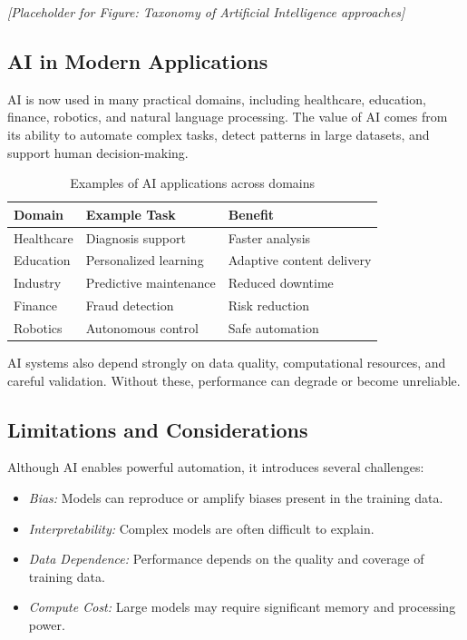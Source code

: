 \textit{[Placeholder for Figure: Taxonomy of Artificial Intelligence approaches]}

\subsection{AI in Modern Applications}
\begin{flushleft}
AI is now used in many practical domains, including healthcare, education, finance, robotics, and natural language processing. The value of AI comes from its ability to automate complex tasks, detect patterns in large datasets, and support human decision-making.

\begin{table}[h]
\centering
\caption{Examples of AI applications across domains}
\begin{tabular}{|l|l|l|}
\hline
\textbf{Domain} & \textbf{Example Task} & \textbf{Benefit} \\ \hline
Healthcare & Diagnosis support & Faster analysis \\ \hline
Education & Personalized learning & Adaptive content delivery \\ \hline
Industry & Predictive maintenance & Reduced downtime \\ \hline
Finance & Fraud detection & Risk reduction \\ \hline
Robotics & Autonomous control & Safe automation \\ \hline
\end{tabular}
\label{tab:ai_applications}
\end{table}

AI systems also depend strongly on data quality, computational resources, and careful validation. Without these, performance can degrade or become unreliable.
\end{flushleft}

\subsection{Limitations and Considerations}
\begin{flushleft}
Although AI enables powerful automation, it introduces several challenges:

\begin{itemize}
\item \textit{Bias:} Models can reproduce or amplify biases present in the training data.
\item \textit{Interpretability:} Complex models are often difficult to explain.
\item \textit{Data Dependence:} Performance depends on the quality and coverage of training data.
\item \textit{Compute Cost:} Large models may require significant memory and processing power.
\end{itemize}
\end{flushleft}


